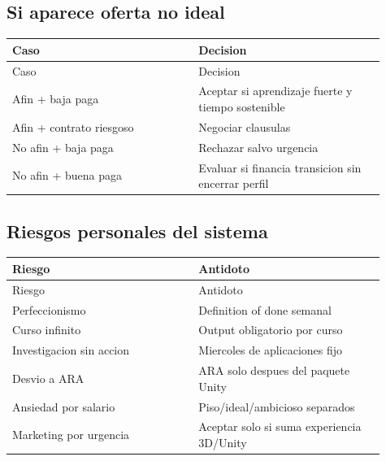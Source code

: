 \subsection{Si aparece oferta no ideal}


\begin{center}
\scriptsize
\begin{longtable}{>{\raggedright\arraybackslash}p{0.455\linewidth} >{\raggedright\arraybackslash}p{0.455\linewidth}}
\toprule
Caso & Decision \\
\midrule
\endfirsthead
\toprule
Caso & Decision \\
\midrule
\endhead
Afin + baja paga & Aceptar si aprendizaje fuerte y tiempo sostenible \\
Afin + contrato riesgoso & Negociar clausulas \\
No afin + baja paga & Rechazar salvo urgencia \\
No afin + buena paga & Evaluar si financia transicion sin encerrar perfil \\
\bottomrule
\end{longtable}
\end{center}



\subsection{Riesgos personales del sistema}


\begin{center}
\scriptsize
\begin{longtable}{>{\raggedright\arraybackslash}p{0.455\linewidth} >{\raggedright\arraybackslash}p{0.455\linewidth}}
\toprule
Riesgo & Antidoto \\
\midrule
\endfirsthead
\toprule
Riesgo & Antidoto \\
\midrule
\endhead
Perfeccionismo & Definition of done semanal \\
Curso infinito & Output obligatorio por curso \\
Investigacion sin accion & Miercoles de aplicaciones fijo \\
Desvio a ARA & ARA solo despues del paquete Unity \\
Ansiedad por salario & Piso/ideal/ambicioso separados \\
Marketing por urgencia & Aceptar solo si suma experiencia 3D/Unity \\
\bottomrule
\end{longtable}
\end{center}

